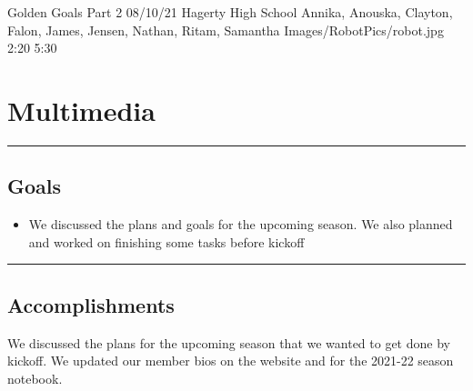 \insertmeeting 
	{Golden Goals Part 2} 
	{08/10/21}
	{Hagerty High School}
	{Annika, Anouska, Clayton, Falon, James, Jensen, Nathan, Ritam, Samantha}
	{Images/RobotPics/robot.jpg}
	{2:20}
  	{5:30}
	
\section*{Multimedia}
\noindent\hfil\rule{\textwidth}{.4pt}\hfil
\subsection*{Goals}
\begin{itemize}
    \item We discussed the plans and goals for the upcoming season. We also planned and worked on finishing some tasks before kickoff

\end{itemize} 

\noindent\hfil\rule{\textwidth}{.4pt}\hfil

\subsection*{Accomplishments}
We discussed the plans for the upcoming season that we wanted to get done by kickoff. We updated our member bios on the website and for the 2021-22 season notebook. 